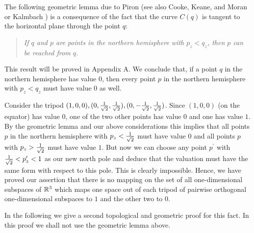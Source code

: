 The following geometric lemma due to Piron \cite{piron-76}
(see also
Cooke, Keane, and Moran \cite{c-k-m} or Kalmbach \cite{kalmbach-86})
is a consequence of the fact that the curve $C(q)$ is tangent to
the horizontal plane through the point $q$:
\begin{quote}
{\it If $q$ and $p$ are points in the northern hemisphere
with $p_z < q_z$, then $p$ can be reached from $q$.}
\end{quote}
This result will be proved in Appendix A.
We conclude that, if a point $q$ in the northern hemisphere has value $0$,
then every point $p$ in the northern hemisphere with $p_z < q_z$ must
have value $0$ as well.

Consider the tripod $(1,0,0), (0,{1 \over \sqrt{2}},{1 \over \sqrt{2}}),
(0,-{1 \over \sqrt{2}},{1 \over \sqrt{2}})$. Since $(1,0,0)$ (on the equator)
has value $0$,
one of the two other points has value $0$ and one has
value $1$. By the geometric lemma and our above considerations
this implies that all points $p$ in the northern
hemisphere with $p_z<{ 1\over\sqrt{2}}$ must have value $0$
and all points $p$ with $p_z>{1\over\sqrt{2}}$ must have value $1$.
But now we can choose any point $p^\prime$ with
${1\over\sqrt{2}} < p^\prime_z < 1$
as our new north pole and  deduce that the valuation
must have the same form with respect to this
pole. This is clearly impossible.
Hence, we have proved our assertion that there is no mapping on the
set of all one-dimensional subspaces of ${\Bbb R}^3$
which maps one space out of each tripod of pairwise orthogonal
one-dimensional subspaces to $1$ and the other two to $0$.

In the following we give a second topological and
geometric proof for this fact.
In this proof we shall not use the geometric lemma above.

